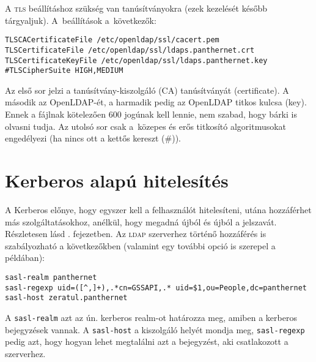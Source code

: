 A \textsc{tls} beállításhoz szükség van tanúsítványokra (ezek kezelését később tárgyaljuk). A~beállítások a~következők:

\begin{Verbatim}[frame=single]
TLSCACertificateFile /etc/openldap/ssl/cacert.pem
TLSCertificateFile /etc/openldap/ssl/ldaps.panthernet.crt
TLSCertificateKeyFile /etc/openldap/ssl/ldaps.panthernet.key
#TLSCipherSuite HIGH,MEDIUM
\end{Verbatim}  

Az első sor jelzi a tanúsítvány-kiszolgáló (CA) tanúsítványát (certificate). A második az OpenLDAP-ét, a harmadik pedig
az OpenLDAP titkos kulcsa (key). Ennek a fájlnak kötelezően 600 jogúnak kell lennie, nem szabad, hogy bárki is olvasni
tudja. Az utolsó sor csak a~közepes és erős titkosító algoritmusokat engedélyezi (ha nincs ott a kettős kereszt (\#)).






\section{Kerberos alapú hitelesítés}

A Kerberos előnye, hogy egyszer kell a felhasználót hitelesíteni, utána hozzáférhet más szolgáltatásokhoz, anélkül, hogy
megadná újból és újból a jelszavát. Részletesen lásd . fejezetben. Az \textsc{ldap} szerverhez történő
hozzáférés is szabályozható a következőkben (valamint egy további opció is szerepel a példában):

\begin{Verbatim}[frame=single]
sasl-realm panthernet
sasl-regexp uid=([^,]+),.*cn=GSSAPI,.* uid=$1,ou=People,dc=panthernet
sasl-host zeratul.panthernet
\end{Verbatim}

A \texttt{sasl-realm} azt az ún. kerberos realm-ot határozza meg, amiben a kerberos bejegyzések vannak. A
\texttt{sasl-host} a kiszolgáló helyét mondja meg, \texttt{sasl-regexp} pedig azt, hogy hogyan lehet megtalálni azt a
bejegyzést, aki csatlakozott a szerverhez.

